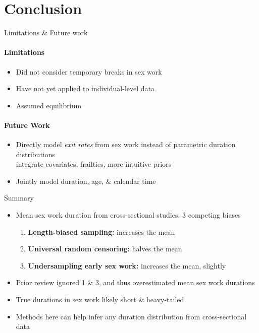 \section{Conclusion}
\begin{frame}{Limitations \& Future work}
  \paragraph{Limitations}
  \begin{itemize}
    \item Did not consider temporary breaks in sex work
    \item Have not yet applied to individual-level data
    \item Assumed equilibrium
  \end{itemize}
  \bigskip
  \paragraph{Future Work}
  \begin{itemize}
    \item Directly model \emph{exit rates} from sex work instead of parametric duration distributions
       \\ \rarr integrate covariates, frailties, more intuitive priors
    \item Jointly model duration, age, \& calendar time
  \end{itemize}
\end{frame}
\begin{frame}{Summary}
  \begin{itemize}
    \item Mean sex work duration from cross-sectional studies: 3 competing biases
    \begin{enumerate}
      \item \textbf{Length-biased sampling:} increases the mean
      \item \textbf{Universal random censoring:} halves the mean
      \item \textbf{Undersampling early sex work:} increases the mean, slightly
    \end{enumerate}
    \item Prior review ignored 1 \& 3, and thus overestimated mean sex work durations
    \item True durations in sex work likely short \& heavy-tailed
    \item Methods here can help infer any duration distribution from cross-sectional data
  \end{itemize}
\end{frame}
